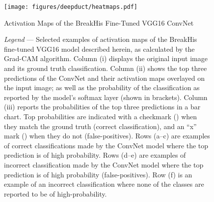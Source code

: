 \begin{figure}[t]
	\begin{center}
		\caption{Activation Maps of the BreakHis Fine-Tuned VGG16 ConvNet  \label{fig:heatmap}}
	\end{center}
	\texttt{[image: figures/deepduct/heatmaps.pdf]}
	
	
\end{figure}
\begin{figure}[t]
	\begin{singlespace}
		\textit{Legend} --- Selected examples of activation maps of the BreakHis fine-tuned VGG16 model described herein, as calculated by the Grad-CAM algorithm. Column (i) displays the original input image and its ground truth classification. Column (ii) shows the top three predictions of the ConvNet and their activation maps overlayed on the input image; as well as the probability of the classification as reported by the model's softmax layer (shown in brackets). Column (iii) reports the probabilities of the top three predictions in a bar chart. Top probabilities are indicated with a checkmark () when they match the ground truth (correct classification), and an ``x'' mark () when they do not (false-positives). Rows (a--c) are examples of correct classifications made by the ConvNet model where the top prediction is of high probability. Rows (d--e) are examples of incorrect classification made by the ConvNet model where the top prediction is of high probability (false-positives). Row (f) is an example of an incorrect classification where none of the classes are reported to be of high-probability.
		
	\end{singlespace}
\end{figure}
